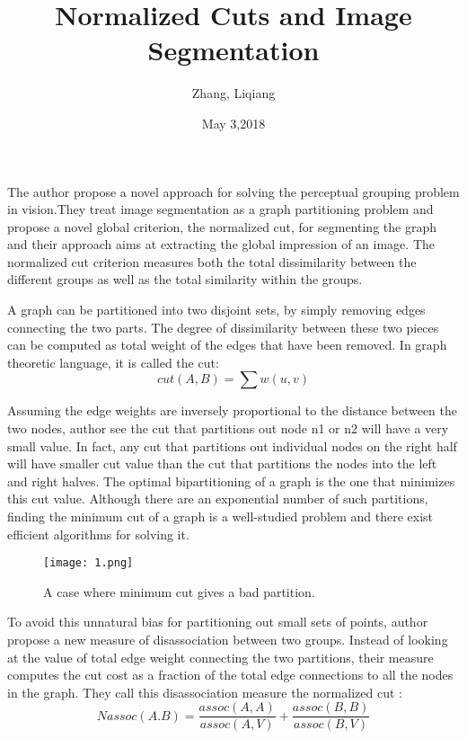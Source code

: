 \documentclass{article}
\author{Zhang, Liqiang}
\date{May 3,2018}
\title{Normalized Cuts and Image Segmentation}
\begin{document}
\maketitle
\par
The author propose a novel approach for solving the perceptual grouping problem in vision.They treat image segmentation as a graph partitioning problem and propose a novel global criterion, the normalized cut, for segmenting the graph and their approach aims at extracting the global impression of an image. The normalized cut criterion measures both the total dissimilarity between the different groups as well as the total similarity within the groups.\cite{Alon1986Eigenvalues}
\par
A graph can be partitioned into two disjoint sets, by simply removing edges connecting the two parts. The degree of dissimilarity between these two pieces can be computed as total weight of the edges that have been removed. In graph theoretic language, it is called the cut:
\begin{equation} \label{}
cut(A,B)=\sum w(u,v)
\end{equation}
\par
Assuming the edge weights are inversely proportional to the distance between the two nodes, author see the cut that partitions out node n1 or n2 will have a very small value. In fact, any cut that partitions out individual nodes on the right half will have smaller cut value than the cut that partitions the nodes into the left and right halves. The optimal bipartitioning of a graph is the one that minimizes this cut value. Although there are an exponential number of such partitions, finding the minimum cut of a graph is a well-studied problem and there exist efficient algorithms for solving it.
\begin{figure}[H]
  \centering
  \texttt{[image: 1.png]}\\
  \caption{A case where minimum cut gives a bad partition.}\label{}
\end{figure}
To avoid this unnatural bias for partitioning out small sets of points, author propose a new measure of disassociation between two groups. Instead of looking at the value of total edge weight connecting the two partitions, their measure computes the cut cost as a fraction of the total edge connections to all the nodes in the graph. They call this disassociation measure the normalized cut :
\begin{equation} \label{}
Nassoc(A.B)=\frac{assoc(A,A)}{assoc(A,V)}+\frac{assoc(B,B)}{assoc(B,V)}
\end{equation}
\par


\end{document}
